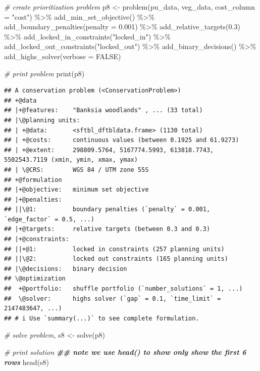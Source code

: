 \documentclass[
  12pt,
]{book}
\newenvironment{Shaded}{\begin{snugshade}}{\end{snugshade}}
\newcommand{\AttributeTok}[1]{\textcolor[rgb]{0.77,0.63,0.00}{#1}}
\newcommand{\CommentTok}[1]{\textcolor[rgb]{0.56,0.35,0.01}{\textit{#1}}}
\newcommand{\ConstantTok}[1]{\textcolor[rgb]{0.00,0.00,0.00}{#1}}
\newcommand{\DocumentationTok}[1]{\textcolor[rgb]{0.56,0.35,0.01}{\textbf{\textit{#1}}}}
\newcommand{\FloatTok}[1]{\textcolor[rgb]{0.00,0.00,0.81}{#1}}
\newcommand{\FunctionTok}[1]{\textcolor[rgb]{0.00,0.00,0.00}{#1}}
\newcommand{\NormalTok}[1]{#1}
\newcommand{\OtherTok}[1]{\textcolor[rgb]{0.56,0.35,0.01}{#1}}
\newcommand{\SpecialCharTok}[1]{\textcolor[rgb]{0.00,0.00,0.00}{#1}}
\newcommand{\StringTok}[1]{\textcolor[rgb]{0.31,0.60,0.02}{#1}}
\begin{document}
\begin{Shaded}
\begin{Highlighting}[]
\CommentTok{\# create prioritization problem}
\NormalTok{p8 }\OtherTok{\textless{}{-}}
  \FunctionTok{problem}\NormalTok{(pu\_data, veg\_data, }\AttributeTok{cost\_column =} \StringTok{"cost"}\NormalTok{) }\SpecialCharTok{\%\textgreater{}\%}
  \FunctionTok{add\_min\_set\_objective}\NormalTok{() }\SpecialCharTok{\%\textgreater{}\%}
  \FunctionTok{add\_boundary\_penalties}\NormalTok{(}\AttributeTok{penalty =} \FloatTok{0.001}\NormalTok{) }\SpecialCharTok{\%\textgreater{}\%}
  \FunctionTok{add\_relative\_targets}\NormalTok{(}\FloatTok{0.3}\NormalTok{) }\SpecialCharTok{\%\textgreater{}\%}
  \FunctionTok{add\_locked\_in\_constraints}\NormalTok{(}\StringTok{"locked\_in"}\NormalTok{) }\SpecialCharTok{\%\textgreater{}\%}
  \FunctionTok{add\_locked\_out\_constraints}\NormalTok{(}\StringTok{"locked\_out"}\NormalTok{) }\SpecialCharTok{\%\textgreater{}\%}
  \FunctionTok{add\_binary\_decisions}\NormalTok{() }\SpecialCharTok{\%\textgreater{}\%}
  \FunctionTok{add\_highs\_solver}\NormalTok{(}\AttributeTok{verbose =} \ConstantTok{FALSE}\NormalTok{)}

\CommentTok{\# print problem}
\FunctionTok{print}\NormalTok{(p8)}
\end{Highlighting}
\end{Shaded}

\begin{verbatim}
## A conservation problem (<ConservationProblem>)
## +@data
## |+@features:    "Banksia woodlands" , ... (33 total)
## |\@planning units:
## | +@data:       <sftbl_dftbldata.frame> (1130 total)
## | +@costs:      continuous values (between 0.1925 and 61.9273)
## | +@extent:     298809.5764, 5167774.5993, 613818.7743, 5502543.7119 (xmin, ymin, xmax, ymax)
## | \@CRS:        WGS 84 / UTM zone 55S
## +@formulation
## |+@objective:   minimum set objective
## |+@penalties:
## ||\@1:          boundary penalties (`penalty` = 0.001, `edge_factor` = 0.5, ...)
## |+@targets:     relative targets (between 0.3 and 0.3)
## |+@constraints:
## ||+@1:          locked in constraints (257 planning units)
## ||\@2:          locked out constraints (165 planning units)
## |\@decisions:   binary decision
## \@optimization
##  +@portfolio:   shuffle portfolio (`number_solutions` = 1, ...)
##  \@solver:      highs solver (`gap` = 0.1, `time_limit` = 2147483647, ...)
## # i Use `summary(...)` to see complete formulation.
\end{verbatim}

\begin{Shaded}
\begin{Highlighting}[]
\CommentTok{\# solve problem,}
\NormalTok{s8 }\OtherTok{\textless{}{-}} \FunctionTok{solve}\NormalTok{(p8)}

\CommentTok{\# print solution}
\DocumentationTok{\#\# note we use head() to show only show the first 6 rows}
\FunctionTok{head}\NormalTok{(s8)}
\end{Highlighting}
\end{Shaded}
\end{document}
